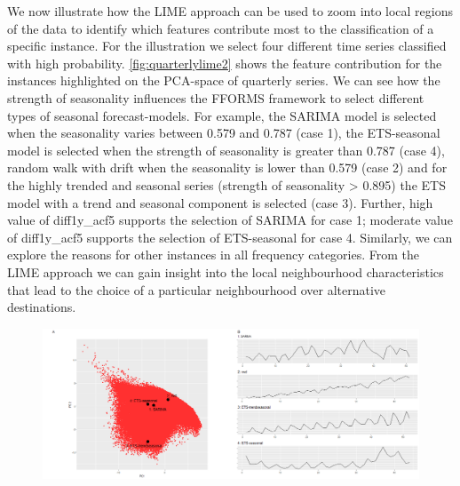 \documentclass[11pt,a4paper,]{article}
\begin{document}
We now illustrate how the LIME approach can be used to zoom into local regions of the data to identify which features contribute most to the classification of a specific instance. For the illustration we select four different time series classified with high probability. \autoref{fig:quarterlylime2} shows the feature contribution for the instances highlighted on the PCA-space of quarterly series. We can see how the strength of seasonality influences the FFORMS framework to select different types of seasonal forecast-models. For example, the SARIMA model is selected when the seasonality varies between 0.579 and 0.787 (case 1), the ETS-seasonal model is selected when the strength of seasonality is greater than 0.787 (case 4), random walk with drift when the seasonality is lower than 0.579 (case 2) and for the highly trended and seasonal series (strength of seasonality \textgreater{} 0.895) the ETS model with a trend and seasonal component is selected (case 3). Further, high value of diff1y\_acf5 supports the selection of SARIMA for case 1; moderate value of diff1y\_acf5 supports the selection of ETS-seasonal for case 4. Similarly, we can explore the reasons for other instances in all frequency categories. From the LIME approach we can gain insight into the local neighbourhood characteristics that lead to the choice of a particular neighbourhood over alternative destinations.

\begin{figure}[h]

{\centering \includegraphics{figures/quarterlylime-1} 

}

\end{figure}
\end{document}
